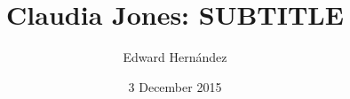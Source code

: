 \documentclass[man,12pt,natbib]{apa6}
\begin{document}
\title{Claudia Jones: SUBTITLE}
\author{Edward Hern\'{a}ndez}
\date{3 December 2015}
\maketitle

\nocite{Davies08}
\nocite{Davies11}
\nocite{Howard13}
\nocite{Johnson08}
\nocite{Johnson84}
\nocite{Jones49a}
\nocite{Jones49b}
\nocite{McDuffie11}
\nocite{OBrien14}
\nocite{Olende14}
\nocite{Sherwood00}
\nocite{Washington03}
\nocite{Weigand01}

\clearpage

\end{document}
